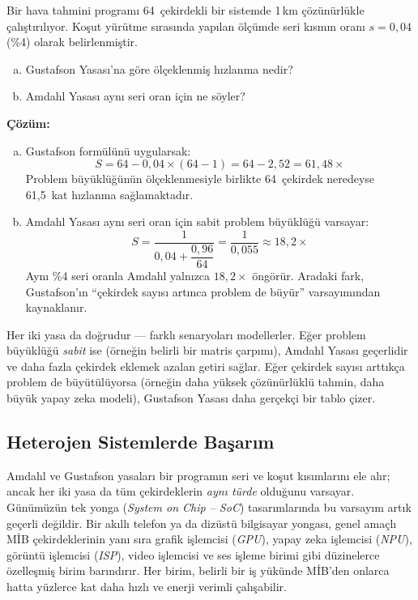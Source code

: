 \begin{ornek}[2.11]
Bir hava tahmini programı 64~çekirdekli bir sistemde 1\,km çözünürlükle çalıştırılıyor. Koşut yürütme sırasında yapılan ölçümde seri kısmın oranı $s = 0{,}04$ (\%4) olarak belirlenmiştir.
\begin{enumerate}[(a)]
    \item Gustafson Yasası'na göre ölçeklenmiş hızlanma nedir?
    \item Amdahl Yasası aynı seri oran için ne söyler?
\end{enumerate}

\textbf{Çözüm:}
\begin{enumerate}[(a)]
    \item Gustafson formülünü uygularsak:
    \[
    S = 64 - 0{,}04 \times (64 - 1) = 64 - 2{,}52 = 61{,}48\times
    \]
    Problem büyüklüğünün ölçeklenmesiyle birlikte 64~çekirdek neredeyse 61,5~kat hızlanma sağlamaktadır.

    \item Amdahl Yasası aynı seri oran için sabit problem büyüklüğü varsayar:
    \[
    S = \frac{1}{0{,}04 + \dfrac{0{,}96}{64}} = \frac{1}{0{,}055} \approx 18{,}2\times
    \]
    Aynı \%4 seri oranla Amdahl yalnızca $18{,}2\times$ öngörür. Aradaki fark, Gustafson'ın ``çekirdek sayısı artınca problem de büyür'' varsayımından kaynaklanır.
\end{enumerate}
\end{ornek}

\begin{bilginot}
Her iki yasa da doğrudur --- farklı senaryoları modellerler. Eğer problem büyüklüğü \emph{sabit} ise (örneğin belirli bir matris çarpımı), Amdahl Yasası geçerlidir ve daha fazla çekirdek eklemek azalan getiri sağlar. Eğer çekirdek sayısı arttıkça problem de büyütülüyorsa (örneğin daha yüksek çözünürlüklü tahmin, daha büyük yapay zeka modeli), Gustafson Yasası daha gerçekçi bir tablo çizer.
\end{bilginot}

\subsection{Heterojen Sistemlerde Başarım}
\label{subsec:heterojen-basarim}

Amdahl ve Gustafson yasaları bir programın seri ve koşut kısımlarını ele alır; ancak her iki yasa da tüm çekirdeklerin \emph{aynı türde} olduğunu varsayar. Günümüzün tek yonga (\emph{System on Chip -- SoC}) tasarımlarında bu varsayım artık geçerli değildir. Bir akıllı telefon ya da dizüstü bilgisayar yongası, genel amaçlı MİB çekirdeklerinin yanı sıra grafik işlemcisi (\emph{GPU}), yapay zeka işlemcisi (\emph{NPU}), görüntü işlemcisi (\emph{ISP}), video işlemcisi ve ses işleme birimi gibi düzinelerce özelleşmiş birim barındırır. Her birim, belirli bir iş yükünde MİB'den onlarca hatta yüzlerce kat daha hızlı ve enerji verimli çalışabilir.

